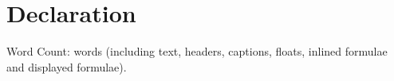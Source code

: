 \chapter*{Declaration}


\ifdefined\lightweight{}
\else
Word Count: \wordcount{}words (including text, headers, captions, floats, inlined formulae and displayed formulae).
\fi


\cleardoublepage{}

